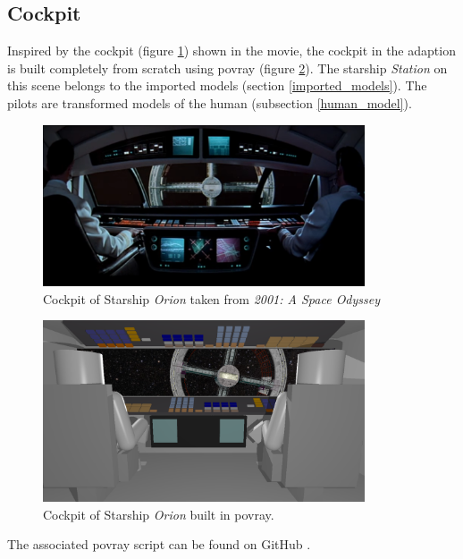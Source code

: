 \subsection{Cockpit} \label{cockpit_model}
Inspired by the cockpit (figure \ref{cockpit_original}) shown in the movie, the cockpit in the adaption  is built completely from scratch using povray (figure \ref{cockpit_povray}). The starship \textit{Station} on this scene belongs to the imported models (section \ref{imported_models}).
The pilots are transformed models of the human (subsection \ref{human_model}).

\begin{figure}[ht]
	\centering
	\includegraphics[width=0.85\textwidth]{images/original_cockpit.png}
	\caption{Cockpit of Starship \textit{Orion} taken from \textit{2001: A Space Odyssey}}
	\label{cockpit_original}
\end{figure}

\begin{figure}[ht]
	\centering
	\includegraphics[width=0.85\textwidth]{images/scene19587.png}
	\caption{Cockpit of Starship \textit{Orion} built in povray.}
	\label{cockpit_povray}
\end{figure}

The associated povray script can be found on GitHub \cite{Quving}.

\newpage
